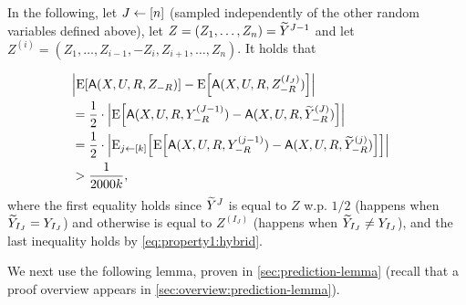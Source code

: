 In the following, let $J \gets [n]$ (sampled independently of the other random variables defined above), let $Z = (Z_1,\ldots,Z_n) = \widetilde{Y}^{J-1}$ and let $Z^{(i)} = (Z_1,\ldots,Z_{i-1}, -Z_i, Z_{i+1},\ldots, Z_n)$. It holds that

\begin{align}\label{eq:property1:exp}
	\lefteqn{\size{\ex{\Ac(X,U,R,Z_{-R})} - \ex{\Ac(X,U,R,Z^{(I_{J})}_{-R})}}}\\
        &= \frac12 \cdot \size{\ex{\Ac(X,U,R,Y^{(J-1)}_{-R}) - \Ac(X,U,R,\tY^{(J)}_{-R})}}\nonumber\\
        &= \frac12\cdot \size{\eex{j \la [k]}{\ex{\Ac(X,U,R,Y^{(j-1)}_{-R}) - \Ac(X,U,R,\tY^{(j)}_{-R})}}}\nonumber\\
        &> \frac1{2000 k},\nonumber
\end{align}
where the first equality holds since $\widetilde{Y}^{J}$ is equal to $Z$ w.p. $1/2$ (happens when $\widetilde{Y}_{I_{J}} = Y_{I_{J}}$)  and otherwise is equal to $Z^{(I_{J})}$ (happens when $\widetilde{Y}_{I_{J}} \neq Y_{I_{J}}$), and the last inequality holds by \cref{eq:property1:hybrid}.




We next use the following lemma, proven in \cref{sec:prediction-lemma} (recall that a proof overview appears in \cref{sec:overview:prediction-lemma}).

\def\PredictionLemma{
    For every $\gamma \in (0,1)$ and $n \in \bbN$, there exists an oracle aided (randomized) algorithm $\Gc = \Gc_{\gamma} \colon [n] \times \zo^{n-1} \rightarrow \set{-1,1,\perp}$ that runs in time $\poly(n,1/\gamma)$ such that the following holds: 
	
	Let $(Z,W) \in \oo^n \times \zo^*$ be jointly distributed random variables, let $R \la \zo^n$ and $I \la [n]$ (sampled independently), 
	and let $F$ be a (randomized) function that satisfies
	\begin{align*}
		\size{\ex{F(R,Z_{R},W) - F(R,Z^{(I)}_{R},W)}} \geq \gamma,
	\end{align*}
	for $Z^{(I)} = (Z_1,\ldots, Z_{I-1}, -Z_I, Z_{I+1},\ldots, Z_n)$. Then
	\begin{enumerate}
		\item $\pr{\Gc^F(I,Z_{-I}, W) = -Z_I} \leq O\paren{\frac{1}{\gamma^2 n}}$, and\label{property1:prediction:bad}
		
		\item $\pr{\Gc^F(I,Z_{-I}, W) = Z_I} \geq \Omega(\gamma) - O\paren{\frac{1}{\gamma^2 n}}$.\label{property1:prediction:good}
	\end{enumerate}
}

